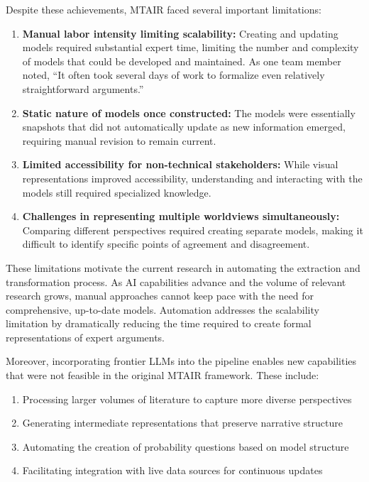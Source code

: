 \documentclass[
  11pt,
  letterpaper,
]{book}
\providecommand{\tightlist}{%
  \setlength{\itemsep}{0pt}\setlength{\parskip}{0pt}}
\begin{document}
Despite these achievements, MTAIR faced several important limitations:

\begin{enumerate}
\def\labelenumi{\arabic{enumi}.}
\item
  \textbf{Manual labor intensity limiting scalability:} Creating and
  updating models required substantial expert time, limiting the number
  and complexity of models that could be developed and maintained. As
  one team member noted, ``It often took several days of work to
  formalize even relatively straightforward arguments.''
\item
  \textbf{Static nature of models once constructed:} The models were
  essentially snapshots that did not automatically update as new
  information emerged, requiring manual revision to remain current.
\item
  \textbf{Limited accessibility for non-technical stakeholders:} While
  visual representations improved accessibility, understanding and
  interacting with the models still required specialized knowledge.
\item
  \textbf{Challenges in representing multiple worldviews
  simultaneously:} Comparing different perspectives required creating
  separate models, making it difficult to identify specific points of
  agreement and disagreement.
\end{enumerate}

These limitations motivate the current research in automating the
extraction and transformation process. As AI capabilities advance and
the volume of relevant research grows, manual approaches cannot keep
pace with the need for comprehensive, up-to-date models. Automation
addresses the scalability limitation by dramatically reducing the time
required to create formal representations of expert arguments.

Moreover, incorporating frontier LLMs into the pipeline enables new
capabilities that were not feasible in the original MTAIR framework.
These include:

\begin{enumerate}
\def\labelenumi{\arabic{enumi}.}
\tightlist
\item
  Processing larger volumes of literature to capture more diverse
  perspectives
\item
  Generating intermediate representations that preserve narrative
  structure
\item
  Automating the creation of probability questions based on model
  structure
\item
  Facilitating integration with live data sources for continuous updates
\end{enumerate}
\end{document}
